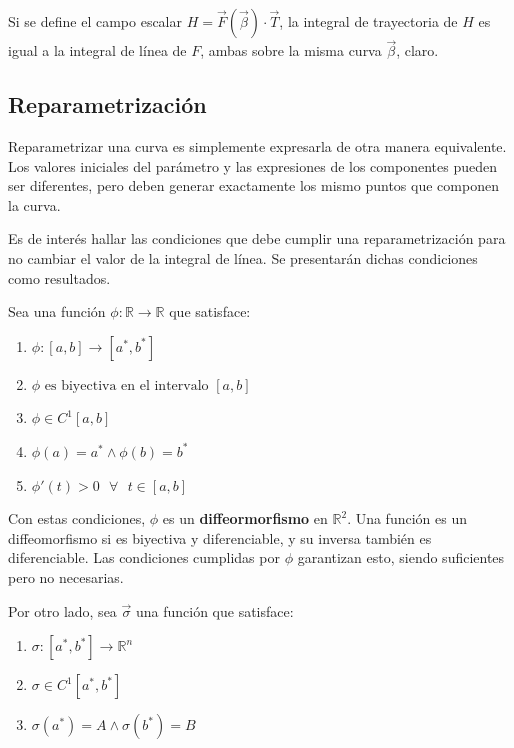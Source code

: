 \documentclass{article}
\renewcommand{\Bbb}{\mathbb}
\begin{document}
Si se define el campo escalar $H = \overrightarrow{F}(\overrightarrow{\beta}) \cdot \overrightarrow{T}$, la integral de trayectoria de $H$ es igual a la integral de línea de $F$, ambas sobre la misma curva $\overrightarrow{\beta}$, claro.

\subsection{Reparametrización}

Reparametrizar una curva es simplemente expresarla de otra manera equivalente. Los valores iniciales del parámetro y las expresiones de los componentes pueden ser diferentes, pero deben generar exactamente los mismo puntos que componen la curva.

Es de interés hallar las condiciones que debe cumplir una reparametrización para no cambiar el valor de la integral de línea. Se presentarán dichas condiciones como resultados.

Sea una función $\phi:\Bbb R \rightarrow \Bbb R$ que satisface:

\begin{enumerate}
\item $\phi:[a, b] \rightarrow [a^*, b^*]$

\item $\phi \text{ es biyectiva en el intervalo } [a,b]$

\item $\phi \in C^1[a,b]$

\item $\phi(a) = a^* \wedge \phi(b) = b^*$

\item $\phi'(t) > 0 \text{ } \forall \text{ } t \in [a,b]$
\end{enumerate}

Con estas condiciones, $\phi$ es un \textbf{diffeormorfismo} en $\Bbb R^2$. Una función es un diffeomorfismo si es biyectiva y diferenciable, y su inversa también es diferenciable. Las condiciones cumplidas por $\phi$ garantizan esto, siendo suficientes pero no necesarias. 

Por otro lado, sea $\overrightarrow{\sigma}$ una función que satisface:

\begin{enumerate}
\item $\sigma: [a^*, b^*] \rightarrow \Bbb R^n $
\item $\sigma\in C^1[a^*, b^*] $
\item $\sigma(a^*) = A \wedge \sigma(b^*) = B $
\end{enumerate}
\end{document}
